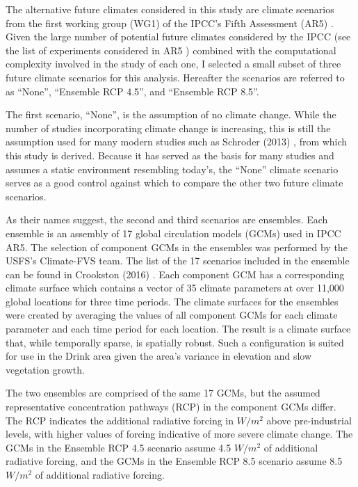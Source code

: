 The alternative future climates considered in this study are climate scenarios from the first working group (WG1) of the IPCC's Fifth Assessment (AR5) \cite{ipcc2013climate}. Given the large number of potential future climates considered by the IPCC (see the list of experiments considered in AR5 \cite{ipccListOfAR5Models}) combined with the computational complexity involved in the study of each one, I selected a small subset of three future climate scenarios for this analysis. Hereafter the scenarios are referred to as ``None'', ``Ensemble RCP 4.5'', and ``Ensemble RCP 8.5''.

The first scenario, ``None'', is the assumption of no climate change. While the number of studies incorporating climate change is increasing, this is still the assumption used for many modern studies such as Schroder (2013) \cite{schroder2016multi}, from which this study is derived. Because it has served as the basis for many studies and assumes a static environment resembling today's, the ``None'' climate scenario serves as a good control against which to compare the other two future climate scenarios.

As their names suggest, the second and third scenarios are ensembles. Each ensemble is an assembly of 17 global circulation models (GCMs) used in IPCC AR5. The selection of component GCMs in the ensembles was performed by the USFS's Climate-FVS \cite{dixon2002essential} team. The list of the 17 scenarios included in the ensemble can be found in Crookston (2016) \cite{ClimateModelsInFVSEnsemble}. Each component GCM has a corresponding climate surface which contains a vector of 35 climate parameters at over 11,000 global locations for three time periods. The climate surfaces for the ensembles were created by averaging the values of all component GCMs for each climate parameter and each time period for each location. The result is a climate surface that, while temporally sparse, is spatially robust. Such a configuration is suited for use in the Drink area given the area's variance in elevation and slow vegetation growth.

The two ensembles are comprised of the same 17 GCMs, but the assumed representative concentration pathways (RCP) in the component GCMs differ. The RCP indicates the additional radiative forcing in $W/m^2$ above pre-industrial levels, with higher values of forcing indicative of more severe climate change. The GCMs in the Ensemble RCP 4.5 scenario assume 4.5 $W/m^2$ of additional radiative forcing, and the GCMs in the Ensemble RCP 8.5 scenario assume 8.5 $W/m^2$ of additional radiative forcing.

